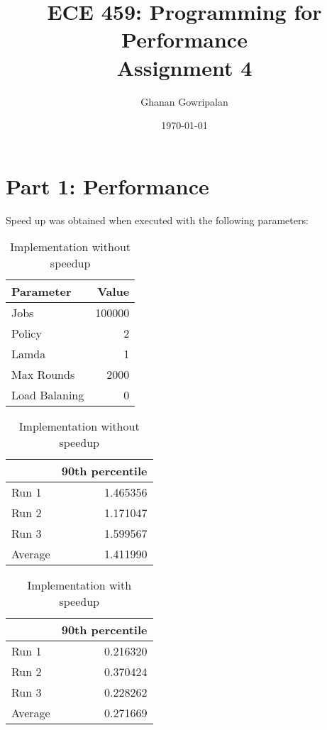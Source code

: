 \documentclass[12pt]{article}
\title{ECE 459: Programming for Performance\\Assignment 4}
\author{Ghanan Gowripalan}
\date{\today}
\begin{document}
\maketitle

\section*{Part 1: Performance}

Speed up was obtained when executed with the following parameters:
\begin{table}[H]
  \centering
  \begin{tabular}{lr}
    {\bf Parameter} & {\bf Value} \\
    \hline
    Jobs & 100000 \\
    Policy & 2 \\
    Lamda & 1 \\
    Max Rounds & 2000 \\
    Load Balaning & 0 \\
  \end{tabular}
  \caption{Implementation without speedup}
  \label{tbl-part1-params}
\end{table}

\begin{table}[H]
  \centering
  \begin{tabular}{lr}
    & {\bf 90th percentile} \\
    \hline
    Run 1 & 1.465356 \\
    Run 2 & 1.171047 \\
    Run 3 & 1.599567 \\
    \hline
    Average & 1.411990 \\
  \end{tabular}
  \caption{Implementation without speedup}
  \label{tbl-part1-originall}
\end{table}


\begin{table}[H]
  \centering
  \begin{tabular}{lr}
    & {\bf 90th percentile} \\
    \hline
    Run 1 & 0.216320 \\
    Run 2 & 0.370424 \\
    Run 3 & 0.228262 \\
    \hline
    Average & 0.271669 \\
  \end{tabular}
  \caption{Implementation with speedup}
  \label{tbl-part1-speedup}
\end{table}
\end{document}
